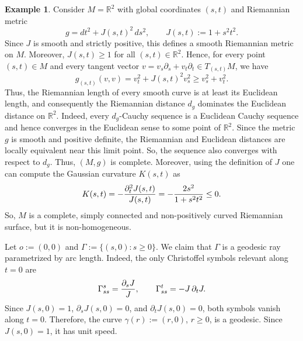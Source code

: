 \documentclass[11pt,a4paper]{article}
\theoremstyle{plain}
\theoremstyle{definition}
\newtheorem{example}[theorem]{Example}
\theoremstyle{remark}
\def\RR{\mathbb{R}}
\begin{document}
\begin{example}\label{ex1}
Consider \(M=\RR^2\) with global coordinates \((s,t)\) and Riemannian metric
\[
g=dt^2+J(s,t)^2\,ds^2,
\qquad
J(s,t):=1+s^2t^2 .
\]
Since \(J\) is smooth and strictly positive, this defines a smooth Riemannian
metric on \(M\). Moreover, \(J(s,t)\geq 1\) for all \((s,t)\in\RR^2\). Hence,
for every point \((s,t)\in M\) and every tangent vector $v=v_s\partial_s+v_t\partial_t\in T_{(s,t)}M$,
we have
\[
g_{(s,t)}(v,v)
=
v_t^2+J(s,t)^2v_s^2
\geq
v_s^2+v_t^2.
\]
Thus, the Riemannian length of every smooth curve is at least its Euclidean
length, and consequently the Riemannian distance \(d_g\) dominates the
Euclidean distance on \(\RR^2\). Indeed, every \(d_g\)-Cauchy sequence is a
Euclidean Cauchy sequence and hence converges in the Euclidean sense to some
point of \(\RR^2\). Since the metric \(g\) is smooth and positive definite,
the Riemannian and Euclidean distances are locally equivalent near this limit
point. So, the sequence also converges with respect to \(d_g\). Thus,
\((M,g)\) is complete. Moreover, using the definition of $J$ one can compute the Gaussian curvature $K(s,t)$ as
$$
K(s,t) = -{\partial_t^2 J(s,t)\over J(s,t)} = - {2s^2\over 1+s^2t^2}\leq 0.
$$
So, $M$ is a complete, simply connected and non-positively curved Riemannian surface, but it is non-homogeneous.%

Let $o:=(0,0)$ and $\Gamma:=\{(s,0):s\geq 0\}$.
We claim that \(\Gamma\) is a geodesic ray parametrized by arc length. Indeed,
the only Christoffel symbols relevant along \(t=0\) are
\[
\Gamma^s_{ss}={\partial_s J\over J},
\qquad
\Gamma^t_{ss}=-J\,\partial_t J.
\]
Since \(J(s,0)=1\), \(\partial_sJ(s,0)=0\), and \(\partial_tJ(s,0)=0\), both
symbols vanish along \(t=0\). Therefore, the curve $\gamma(r):=(r,0)$, $r\geq 0$,
is a geodesic. Since \(J(s,0)=1\), it has unit speed.


\end{example}
\end{document}
